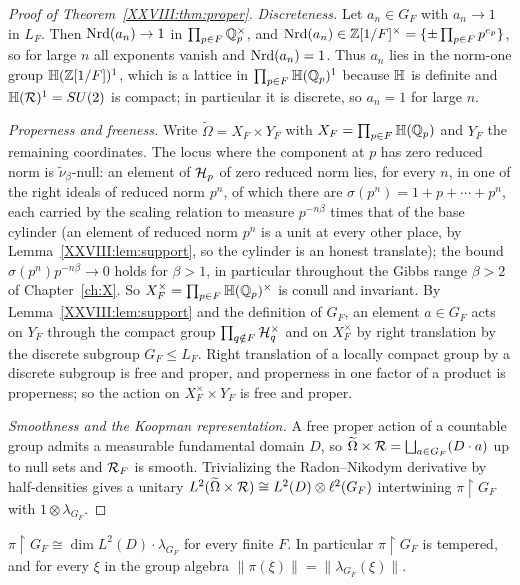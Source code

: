 \begin{proof}[Proof of Theorem~\ref{XXVIII:thm:proper}]
\emph{Discreteness.} Let $a_n\in G_F$ with $a_n\to1$ in $L_F$. Then $\operatorname{Nrd}(a_n)\to1$ in
$\prod_{p\in F}\mathbb{Q}_p^\times$, and $\operatorname{Nrd}(a_n)\in\mathbb{Z}[1/F]^\times=\{\pm\prod_{p\in F}p^{e_p}\}$, so for
large $n$ all exponents vanish and $\operatorname{Nrd}(a_n)=1$. Thus $a_n$ lies in the norm-one group
$\mathbb{H}(\mathbb{Z}[1/F])^1$, which is a lattice in $\prod_{p\in F}\mathbb{H}(\mathbb{Q}_p)^1$ because $\mathbb{H}$ is definite and
$\mathbb{H}(\mathcal{R})^1=SU(2)$ is compact; in particular it is discrete, so $a_n=1$ for large $n$.

\emph{Properness and freeness.} Write $\widetilde\Omega=X_F\times Y_F$ with
$X_F=\prod_{p\in F}\mathbb{H}(\mathbb{Q}_p)$ and $Y_F$ the remaining coordinates. The locus where the component at $p$
has zero reduced norm is $\widetilde\nu_\beta$-null: an element of $\mathcal{H}_p$ of zero reduced
norm lies, for every $n$, in one of the right ideals of reduced norm $p^n$, of which there
are $\sigma(p^n)=1+p+\cdots+p^n$, each carried by the scaling relation to measure
$p^{-n\beta}$ times that of the base cylinder (an element of reduced norm $p^n$ is a unit at
every other place, by Lemma~\ref{XXVIII:lem:support}, so the cylinder is an honest translate); the
bound $\sigma(p^n)p^{-n\beta}\to0$ holds for $\beta>1$, in particular throughout the Gibbs
range $\beta>2$ of Chapter~\ref{ch:X}. So $X_F^\times=\prod_{p\in F}\mathbb{H}(\mathbb{Q}_p)^\times$ is conull and invariant.
By Lemma~\ref{XXVIII:lem:support} and the definition of $G_F$, an element $a\in G_F$ acts on $Y_F$ through
the compact group $\prod_{q\notin F}\mathcal{H}_q^\times$ and on $X_F^\times$ by right translation by the
discrete subgroup $G_F\le L_F$. Right translation of a locally compact group by a discrete subgroup
is free and proper, and properness in one factor of a product is properness; so the action on
$X_F^\times\times Y_F$ is free and proper.

\emph{Smoothness and the Koopman representation.} A free proper action of a countable group admits
a measurable fundamental domain $D$, so $\widetilde\Omega\times\mathcal{R}=\bigsqcup_{a\in G_F}(D\cdot a)$
up to null sets and $\mathcal{R}_F$ is smooth. Trivializing the Radon--Nikodym derivative by half-densities
gives a unitary
$L^2(\widetilde\Omega\times\mathcal{R})\cong L^2(D)\otimes\ell^2(G_F)$ intertwining $\pi\restriction G_F$
with $1\otimes\lambda_{G_F}$.
\end{proof}

\begin{corollary}\label{XXVIII:cor:regular}
$\pi\restriction G_F\cong\dim L^2(D)\cdot\lambda_{G_F}$ for every finite $F$. In particular
$\pi\restriction G_F$ is tempered, and for every $\xi$ in the group algebra
$\|\pi(\xi)\|=\|\lambda_{G_F}(\xi)\|$.
\end{corollary}


